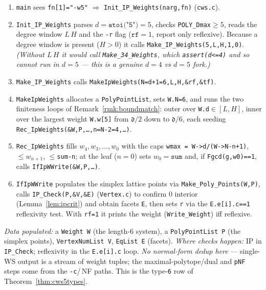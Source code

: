 \documentclass{amsart}
\begin{document}
\begin{enumerate}
  \item \texttt{main} sees \texttt{fn[1]="-w5"} $\Rightarrow$
        \texttt{Init\_IP\_Weights(narg,fn)} (\texttt{cws.c}).
  \item \texttt{Init\_IP\_Weights} parses $d=\texttt{atoi("5")}=5$, checks
        \texttt{POLY\_Dmax}$\ge 5$, reads the degree window $L\,H$ and the
        \texttt{-r} flag ($\texttt{rf}=1$, report only reflexive). Because a
        degree window is present ($H>0$) it calls
        \texttt{Make\_IP\_Weights(5,L,H,1,0)}. \emph{(Without $L\,H$ it would
        call \texttt{Make\_34\_Weights}, which \texttt{assert(d<=4)} and so
        \emph{cannot} run in $d=5$ --- this is a genuine $d=4$ vs $d=5$ fork.)}
  \item \texttt{Make\_IP\_Weights} calls
        \texttt{MakeIpWeights(N=d+1=6,L,H,\&rf,\&tf)}.
  \item \texttt{MakeIpWeights} allocates a \texttt{PolyPointList}, sets
        \texttt{W.N=6}, and runs the two finiteness loops of
        Remark~\ref{rmk:boundmatch}: outer over \texttt{W.d}$\in[L,H]$, inner
        over the largest weight \texttt{W.w[5]} from $\mathfrak d/2$ down to
        $\mathfrak d/6$, each seeding
        \texttt{Rec\_IpWeights(\&W,P,\dots,n=N-2=4,\dots)}.
  \item \texttt{Rec\_IpWeights} fills $w_4,w_3,\dots,w_0$ with the caps
        \texttt{wmax = W->d/(W->N-n+1)}, $\le w_{n+1}$, $\le$\texttt{sum-n};
        at the leaf ($n=0$) sets $w_0=\texttt{sum}$ and, if
        \texttt{Fgcd(g,w0)==1}, calls \texttt{IfIpWWrite(\&W,P,\dots)}.
  \item \texttt{IfIpWWrite} populates the simplex lattice points via
        \texttt{Make\_Poly\_Points(W,P)}, calls
        \texttt{IP\_Check(P,\&V,\&E)} (\texttt{Vertex.c}) to confirm $0$
        interior (Lemma~\ref{lem:ipcrit}) and obtain facets \texttt{E}, then
        sets \texttt{r} via the \texttt{E.e[i].c==1} reflexivity test. With
        \texttt{rf=1} it prints the weight (\texttt{Write\_Weight}) iff
        reflexive.
\end{enumerate}
\emph{Data populated:} a \texttt{Weight W} (the length-$6$ system),
a \texttt{PolyPointList P} (the simplex points), \texttt{VertexNumList V},
\texttt{EqList E} (facets). \emph{Where checks happen:} IP in
\texttt{IP\_Check}; reflexivity in the \texttt{E.e[i].c} loop. \emph{No
normal-form dedup here} --- single-WS output is a stream of weight tuples; the
maximal-polytope/dual and \texttt{pNF} steps come from the \texttt{-c}/\,NF
paths. This is the type-\texttt{6} row of Theorem~\ref{thm:cws5types}.
\end{document}
